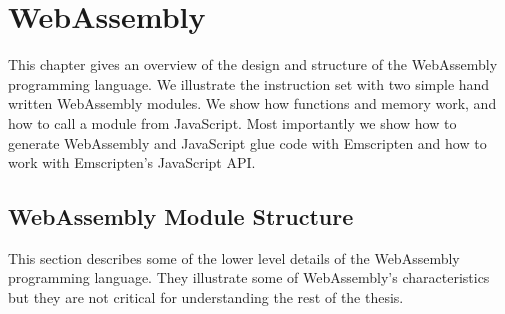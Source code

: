 \documentclass[11pt]{book}
\begin{document}




\chapter{WebAssembly}
This chapter gives an overview of the design and structure of the WebAssembly programming language. We illustrate the instruction set with two simple hand written WebAssembly modules. We show how functions and memory work, and how to call a module from JavaScript. Most importantly we show how to generate WebAssembly and JavaScript glue code with Emscripten and how to work with Emscripten's JavaScript API.











\section{WebAssembly Module Structure}

This section describes some of the lower level details of the WebAssembly programming language. They illustrate some of WebAssembly's characteristics but they are not critical for understanding the rest of the thesis.
\end{document}
